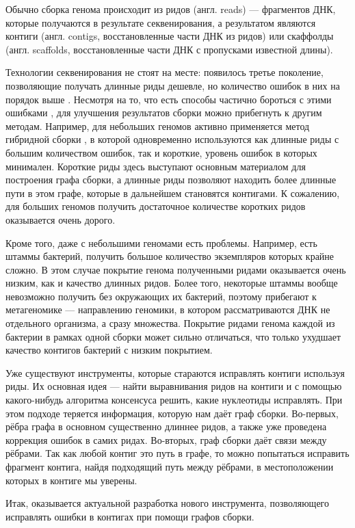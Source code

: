 \documentclass[14pt]{matmex-diploma-custom}
\begin{document}
Обычно сборка генома происходит из ридов (англ. reads) --- фрагментов ДНК, которые получаются в результате секвенирования, а результатом являются контиги (англ. contigs, восстановленные части ДНК из ридов) или скаффолды (англ. scaffolds, восстановленные части ДНК с пропусками известной длины).

Технологии секвенирования не стоят на месте: появилось третье поколение, позволяющие получать длинные риды дешевле, но количество ошибок в них на порядок выше \cite{art:reads}. Несмотря на то, что есть способы частично бороться с этими ошибками \cite{art:alic2016objective}, для улучшения результатов сборки можно прибегнуть к другим методам. Например, для небольших геномов активно применяется метод гибридной сборки \cite{art:hybridSpades}, в которой одновременно используются как длинные риды с большим количеством ошибок, так и короткие, уровень ошибок в которых минимален. Короткие риды здесь выступают основным материалом для построения графа сборки, а длинные риды позволяют находить более длинные пути в этом графе, которые в дальнейшем становятся контигами. К сожалению, для больших геномов получить достаточное количестве коротких ридов оказывается очень дорого.

Кроме того, даже с небольшими геномами есть проблемы. Например, есть штаммы бактерий, получить большое количество экземпляров которых крайне сложно. В этом случае покрытие генома полученными ридами оказывается очень низким, как и качество длинных ридов. Более того, некоторые штаммы вообще невозможно получить без окружающих их бактерий, поэтому прибегают к метагеномике --- направлению геномики, в котором рассматриваются ДНК не отдельного организма, а сразу множества. Покрытие ридами генома каждой из бактерии в рамках одной сборки может сильно отличаться, что только ухудшает качество контигов бактерий с низким покрытием.

Уже существуют инструменты, которые стараются исправлять контиги используя риды. Их основная идея --- найти выравнивания ридов на контиги и с помощью какого-нибудь алгоритма консенсуса решить, какие нуклеотиды исправлять. При этом подходе теряется информация, которую нам даёт граф сборки. Во-первых, рёбра графа в основном существенно длиннее ридов, а также уже проведена коррекция ошибок в самих ридах. Во-вторых, граф сборки даёт связи между рёбрами. Так как любой контиг это путь в графе, то можно попытаться исправить фрагмент контига, найдя подходящий путь между рёбрами, в местоположении которых в контиге мы уверены.

Итак, оказывается актуальной разработка нового инструмента, позволяющего исправлять ошибки в контигах при помощи графов сборки.
\end{document}
